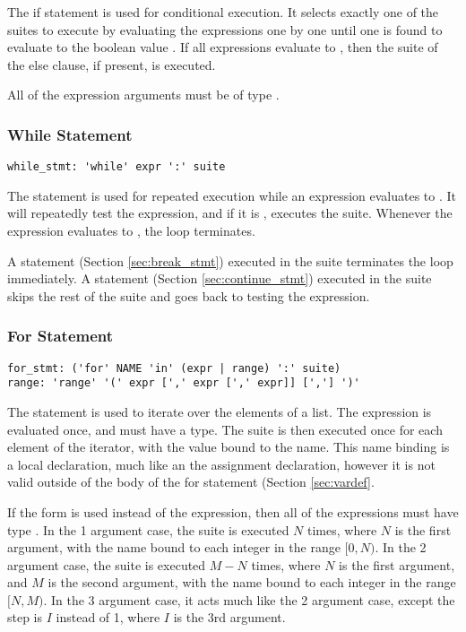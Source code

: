 The if statement is used for conditional execution. It selects exactly one of
the suites to execute by evaluating the expressions one by one until one is
found to evaluate to the boolean value . If all expressions evaluate
to , then the suite of the else clause, if present, is executed.

All of the expression arguments must be of type .

\subsubsection{While Statement}
\begin{lstlisting}
while_stmt: 'while' expr ':' suite
\end{lstlisting}

The  statement is used for repeated execution while an expression evaluates
to . It will repeatedly test the expression, and if it is
, executes the suite. Whenever the expression evaluates to
, the loop terminates.

A  statement (Section \ref{sec:break_stmt}) executed in the suite
terminates the loop immediately. A  statement (Section
\ref{sec:continue_stmt}) executed in the suite skips the rest of the suite and
goes back to testing the expression.


\subsubsection{For Statement}
\begin{lstlisting}
for_stmt: ('for' NAME 'in' (expr | range) ':' suite)
range: 'range' '(' expr [',' expr [',' expr]] [','] ')'
\end{lstlisting}

The  statement is used to iterate over the elements of a list. The
expression is evaluated once, and must have a \code{[T]} type. The suite is then
executed once for each element of the iterator, with the value bound to the
name. This name binding is a local declaration, much like an the assignment
declaration, however it is not valid outside of the body of the for statement
(Section \ref{sec:vardef}.

If the  form is used instead of the expression, then all of the
expressions must have type . In the 1 argument case, the suite is
executed $N$ times, where $N$ is the first argument, with the name bound to each
integer in the range $[0, N)$. In the 2 argument case, the suite is executed
$M-N$ times, where $N$ is the first argument, and $M$ is the second argument,
with the name bound to each integer in the range $[N, M)$. In the 3 argument
case, it acts much like the 2 argument case, except the step is $I$ instead of
1, where $I$ is the 3rd argument.

